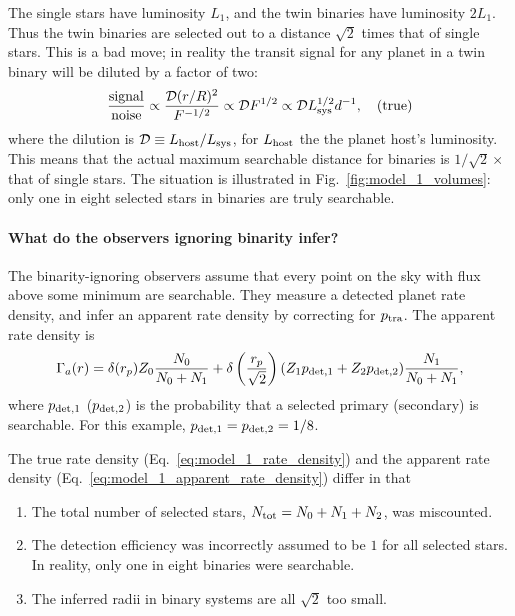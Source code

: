 The single stars have luminosity $L_1$, and the twin binaries have luminosity 
$2L_1$.
Thus the twin binaries are selected out to a distance $\sqrt{2}$ times 
that of single stars.
This is a bad move; in reality the transit signal for any planet in a 
twin binary will be diluted by a factor of two:
\begin{equation}
\frac{{\rm signal}}{{\rm noise}}
\propto \frac{\mathcal{D} (r/R)^2}{F^{-1/2}}
\propto \mathcal{D} F^{1/2}
\propto \mathcal{D} L_{\rm sys}^{1/2} d^{-1}, \quad ({\rm true})
\end{equation}
where the dilution is $\mathcal{D} \equiv L_{\rm host}/L_{\rm sys}$, for 
$L_{\rm host}$ the the planet host's luminosity.
This means that the actual maximum searchable distance for binaries is 
$1/\sqrt{2}\times$ that of single stars.
The situation is illustrated in Fig.~\ref{fig:model_1_volumes}: only one in 
eight selected stars in binaries are truly searchable.

\paragraph{What do the observers ignoring binarity infer?} 
The binarity-ignoring observers assume that every point on the sky with flux 
above some minimum are searchable.
They measure a detected planet rate density, and infer an apparent rate 
density by correcting for $p_{\rm tra}$.
The apparent rate density is
\begin{equation}
\Gamma_a(r) = 
\delta(r_p) Z_0 \frac{N_0}{N_0+N_1}  +
\delta\left(\frac{r_p}{\sqrt{2}}\right) 
(Z_1 p_{{\rm det},1} + Z_2 p_{{\rm det},2}) \frac{N_1}{N_0+N_1},
\label{eq:model_1_apparent_rate_density}
\end{equation}
where $p_{{\rm det},1}$ ($p_{{\rm det},2}$) is the probability that a selected 
primary (secondary) is searchable.
For this example, $p_{{\rm det},1}=p_{{\rm det},2}=1/8$.

The true rate density (Eq.~\ref{eq:model_1_rate_density}) and the
apparent rate density (Eq.~\ref{eq:model_1_apparent_rate_density})
differ in that
\begin{enumerate}
\item The total number of selected stars, $N_{\rm tot} = N_0+N_1+N_2$, was 
miscounted.
%
\item The detection efficiency was incorrectly assumed to be $1$ for all 
selected stars. In reality, only one in eight binaries were searchable.
%
\item The inferred radii in binary systems are all $\sqrt{2}$ too small.
\end{enumerate}

